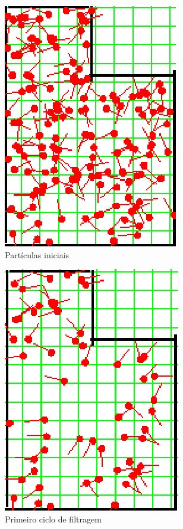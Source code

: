 \begin{figure}[H]
  \centering
  \includegraphics[scale=1]{figuras/cen4_ex5/1.eps}
  \caption[Partículas Iniciais]{Partículas iniciais}
  \label{img:cen4_ex5_1}
\end{figure}

\begin{figure}[H]
  \centering
  \includegraphics[scale=1]{figuras/cen4_ex5/2.eps}
  \caption[Primeiro Ciclo de Filtragem]{Primeiro ciclo de filtragem}
  \label{img:cen4_ex5_2}
\end{figure}

